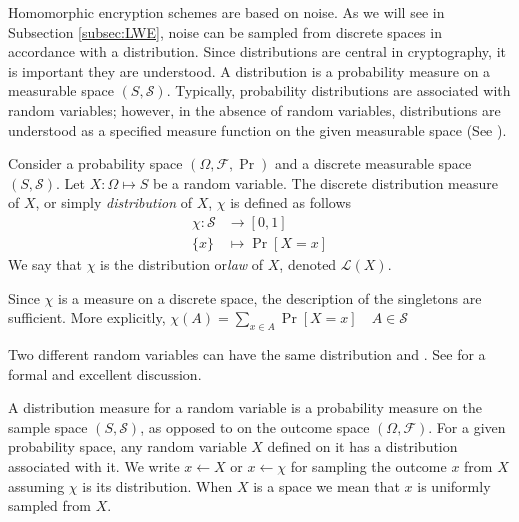 Homomorphic encryption schemes are based on noise. As we will see in Subsection \ref{subsec:LWE}, noise can be sampled from discrete spaces in accordance with a distribution. Since distributions are central in cryptography, it is important they are understood. A distribution is a probability measure on a measurable space $(S, \mathcal{S})$. Typically, probability distributions are associated with random variables; however, in the absence of random variables, distributions are understood as a specified measure function on the given measurable space (See \cite[pp. 83]{kallenberg-probability}).
\begin{definition}
Consider a probability space $(\Omega, \mathcal{F}, \operatorname{Pr})$ and a discrete measurable space $(S,\mathcal{S})$. Let $X \colon \Omega \mapsto S$ be a random variable. The discrete distribution measure of $X$, or simply \textit{distribution} of $X$, $\chi$ is defined as follows
\begin{equation*}
\begin{aligned}
    \chi \colon \mathcal{S} &\to [0,1]\\
    \{x\} &\mapsto \operatorname{Pr}[X = x]
\end{aligned}
\end{equation*}
We say that $\chi$ is the distribution or\textit{law} of $X$, denoted $\mathcal{L}(X)$. 
\end{definition}
\begin{remark}
    Since $\chi$ is a measure on a discrete space, the description of the singletons are sufficient. More explicitly, $\chi(A) = \sum_{x \in A} \operatorname{Pr}[X = x] \quad A \in \mathcal{S}$
\end{remark}
\begin{remark}
     Two different random variables can have the same distribution and . See \cite{cont-finance} for a formal and excellent discussion.
\end{remark}

A distribution measure for a random variable is a probability measure on the sample space $(S,\mathcal{S})$, as opposed to on the outcome space $(\Omega, \mathcal{F})$. For a given probability space, any random variable $X$ defined on it has a distribution associated with it. We write $x \leftarrow X$ or $x \leftarrow \chi$ for sampling the outcome $x$ from $X$ assuming $\chi$ is its distribution. When $X$ is a space we mean that $x$ is uniformly sampled from $X$.


